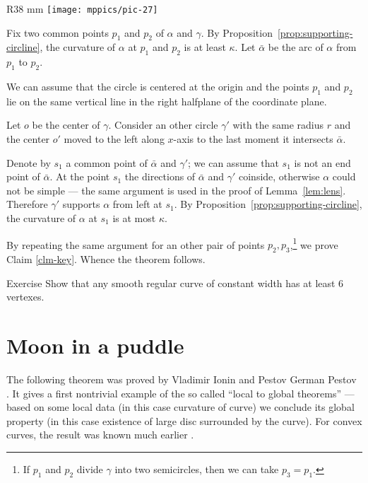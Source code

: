 \begin{wrapfigure}{R}{38 mm}
\vskip-0mm
\centering
\texttt{[image: mppics/pic-27]}
\vskip0mm
\end{wrapfigure}
  
Fix two common points $p_1$ and $p_2$ of $\alpha$ and $\gamma$.
By Proposition~\ref{prop:supporting-circline}, the curvature of $\alpha$ at $p_1$ and $p_2$ is at least $\kappa$.
Let $\bar\alpha$ be the arc of $\alpha$ from $p_1$ to $p_2$.

We can assume that the circle is centered at the origin 
and the points $p_1$ and $p_2$ lie on the same vertical line in the right halfplane of the coordinate plane.

Let $o$ be the center of $\gamma$.
Consider an other circle $\gamma'$ with the same radius $r$ and the center $o'$ moved to the left along $x$-axis to the last moment it intersects $\bar\alpha$.

Denote by $s_1$ a common point of $\bar\alpha$ and $\gamma'$;
we can assume that $s_1$ is not an end point of $\bar\alpha$.
At the point $s_1$ the directions of $\bar\alpha$ and $\gamma'$ coinside,
otherwise $\alpha$ could not be simple --- the same argument is used in the proof of Lemma~\ref{lem:lens}.
Therefore $\gamma'$ supports $\alpha$ from left at $s_1$.
By Proposition~\ref{prop:supporting-circline}, the curvature of $\alpha$ at $s_1$ is at most $\kappa$.

By repeating the same argument for an other pair of points $p_2,p_3$,\footnote{If $p_1$ and $p_2$ divide $\gamma$ into two semicircles, then we can take $p_3=p_1$.} 
we prove Claim \ref{clm-key}.
Whence the theorem follows.
\qeds

\begin{thm}{Exercise}
Show that any smooth regular curve of constant width has at least 6 vertexes.
\end{thm}

\section{Moon in a puddle}

The following theorem was proved by Vladimir Ionin and Pestov German Pestov \cite{pestov-ionin}.
It gives a first nontrivial example of the so called ``local to global theorems'' --- based on some local data (in this case curvature of curve) we conclude its global property (in this case existence of large disc surrounded by the curve).
For convex curves, the result was known much earlier \cite[\S 24]{blaschke}.

